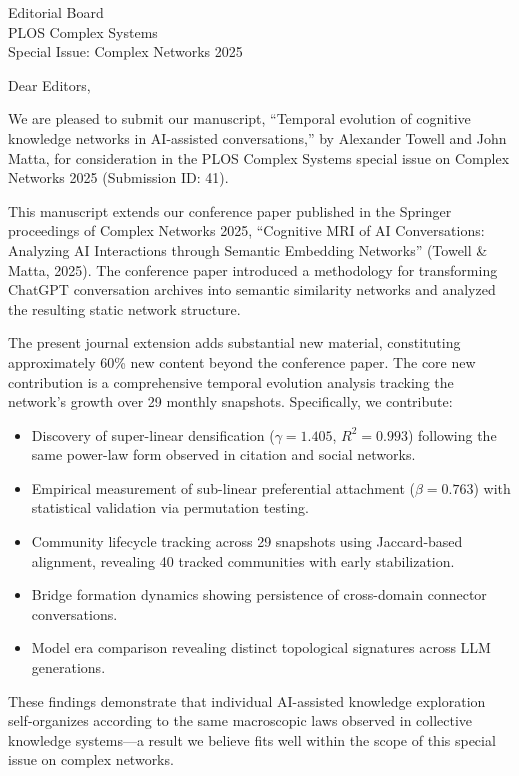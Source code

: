 \documentclass[11pt]{letter}
\date{February 25, 2026}
\begin{document}
\begin{letter}{Editorial Board\\
PLOS Complex Systems\\
Special Issue: Complex Networks 2025}

\opening{Dear Editors,}

We are pleased to submit our manuscript, ``Temporal evolution of cognitive knowledge networks in AI-assisted conversations,'' by Alexander Towell and John Matta, for consideration in the PLOS Complex Systems special issue on Complex Networks 2025 (Submission ID: 41).

This manuscript extends our conference paper published in the Springer proceedings of Complex Networks 2025, ``Cognitive MRI of AI Conversations: Analyzing AI Interactions through Semantic Embedding Networks'' (Towell \& Matta, 2025). The conference paper introduced a methodology for transforming ChatGPT conversation archives into semantic similarity networks and analyzed the resulting static network structure.

The present journal extension adds substantial new material, constituting approximately 60\% new content beyond the conference paper. The core new contribution is a comprehensive temporal evolution analysis tracking the network's growth over 29 monthly snapshots. Specifically, we contribute:

\begin{itemize}
  \item Discovery of super-linear densification ($\gamma = 1.405$, $R^2 = 0.993$) following the same power-law form observed in citation and social networks.
  \item Empirical measurement of sub-linear preferential attachment ($\beta = 0.763$) with statistical validation via permutation testing.
  \item Community lifecycle tracking across 29 snapshots using Jaccard-based alignment, revealing 40 tracked communities with early stabilization.
  \item Bridge formation dynamics showing persistence of cross-domain connector conversations.
  \item Model era comparison revealing distinct topological signatures across LLM generations.
\end{itemize}

These findings demonstrate that individual AI-assisted knowledge exploration self-organizes according to the same macroscopic laws observed in collective knowledge systems---a result we believe fits well within the scope of this special issue on complex networks.


\end{letter}
\end{document}
